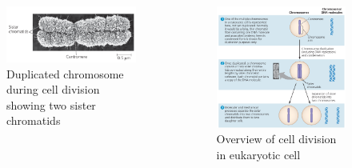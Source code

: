 \documentclass[11pt,ignorenonframetext,aspectratio=169]{beamer}
\begin{document}
\begin{frame}{}
\protect\hypertarget{section-6}{}
\begin{columns}[T,onlytextwidth]
  

\begin{figure}

{\centering \includegraphics[width=0.8\linewidth]{../images/duplicated_chromosomes_hd} 

}

\caption{Duplicated chromosome during cell division showing two sister chromatids}\label{fig:duplicated-chromosome}
\end{figure}


\begin{figure}
\includegraphics[width=0.95\linewidth]{../images/cell_division_eukaryotes_overview} \caption{Overview of cell division in eukaryotic cell}\label{fig:overview-cell-division}
\end{figure}

\end{columns}
\end{frame}
\end{document}
